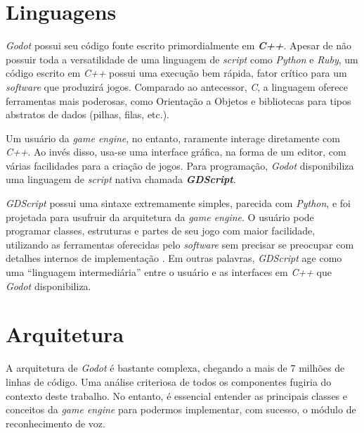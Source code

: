 
\section{Linguagens}
\label{godotLanguages}

\textit{Godot} possui seu código fonte escrito primordialmente em \textbf{\textit{C++}}. Apesar de não possuir toda a versatilidade de uma linguagem de \textit{script} como \textit{Python} e \textit{Ruby}, um código escrito em \textit{C++} possui uma execução bem rápida, fator crítico para um \textit{software} que produzirá jogos. Comparado ao antecessor, \textit{C}, a linguagem oferece ferramentas mais poderosas, como Orientação a Objetos e bibliotecas para tipos abstratos de dados (pilhas, filas, etc.).

Um usuário da \textit{game engine}, no entanto, raramente interage diretamente com \textit{C++}. Ao invés disso, usa-se uma interface gráfica, na forma de um editor, com várias facilidades para a criação de jogos. Para programação, \textit{Godot} disponibiliza uma linguagem de \textit{script} nativa chamada \textbf{\textit{GDScript}}.

\textit{GDScript} possui uma sintaxe extremamente simples, parecida com \textit{Python}, e foi projetada para usufruir da arquitetura da \textit{game engine}. O usuário pode programar classes, estruturas e partes de seu jogo com maior facilidade, utilizando as ferramentas oferecidas pelo \textit{software} sem precisar se preocupar com detalhes internos de implementação \citep{godotScripting}. Em outras palavras, \textit{GDScript} age como uma ``linguagem intermediária'' entre o usuário e as interfaces em \textit{C++} que \textit{Godot} disponibiliza.


\section{Arquitetura}

A arquitetura de \textit{Godot} é bastante complexa, chegando a mais de 7 milhões de linhas de código. Uma análise criteriosa de todos os componentes fugiria do contexto deste trabalho. No entanto, é essencial entender as principais classes e conceitos da \textit{game engine} para podermos implementar, com sucesso, o módulo de reconhecimento de voz.

